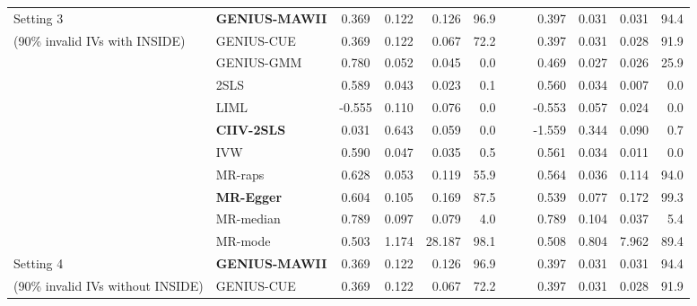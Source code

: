 \documentclass[12pt]{article}
\begin{document}
{\begin{table}[ht]
{\begin{tabular}{llcrrrrlrrrr}
Setting 3      & \textbf{GENIUS-MAWII} & 0.369  & 0.122 & 0.126  & 96.9  &  &       & 0.397  & 0.031 & 0.031 & 94.4 \\
{\small(90\% invalid IVs with INSIDE)} & GENIUS-CUE   & 0.369  & 0.122  & 0.067  & 72.2  &  &  & 0.397  & 0.031 & 0.028 & 91.9 \\
           & {GENIUS-GMM}   & 0.780  & 0.052 & 0.045  & 0.0   &  &             & 0.469  & 0.027 & 0.026 & 25.9 \\
           & 2SLS         & 0.589  & 0.043 & 0.023  & 0.1   &  &             & 0.560  & 0.034 & 0.007 & 0.0  \\
           & LIML         & -0.555 & 0.110 & 0.076  & 0.0   &  &             & -0.553 & 0.057 & 0.024 & 0.0  \\
           & \textbf{CIIV-2SLS}     &0.031	&0.643	&	0.059&	0.0 &&&-1.559	&0.344	&0.090	&0.7\\
           & IVW          & 0.590  & 0.047 & 0.035  & 0.5   &  &             & 0.561  & 0.034 & 0.011 & 0.0  \\
           & MR-raps      & 0.628  & 0.053 & 0.119  & 55.9  &  &             & 0.564  & 0.036 & 0.114 & 94.0 \\
           & \textbf{MR-Egger}     & 0.604  & 0.105 & 0.169  & 87.5  &  &             & 0.539  & 0.077 & 0.172 & 99.3 \\
           & MR-median    & 0.789  & 0.097 & 0.079  & 4.0   &  &             & 0.789  & 0.104 & 0.037 & 5.4  \\
           & MR-mode      & 0.503  & 1.174 & 28.187 & 98.1  &  &             & 0.508  & 0.804 & 7.962 & 89.4 \\ \hline
Setting 4      & \textbf{GENIUS-MAWII} & 0.369  & 0.122 & 0.126  & 96.9  &  &      & 0.397  & 0.031 & 0.031 & 94.4 \\
{\small (90\% invalid IVs without INSIDE)} & GENIUS-CUE   & 0.369  &  0.122 & 0.067  & 72.2  &  & & 0.397  & 0.031 & 0.028 & 91.9 \\

\end{tabular}}
\end{table}}
\end{document}
